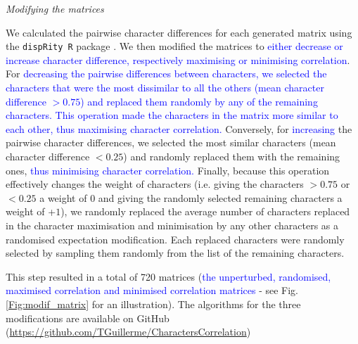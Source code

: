 \documentclass[12pt,letterpaper]{article}
\renewcommand{\subsection}[1]{%
\bigskip
\begin{center}
\begin{large}
\normalfont\itshape #1
\end{large}
\end{center}}
\begin{document}
\subsection{Modifying the matrices}
We calculated the pairwise character differences for each generated matrix using the \texttt{dispRity R} package \citep{thomas_guillerme_2016_55646}.
We then modified the matrices to \textcolor{blue}{either decrease or increase character difference, respectively maximising or minimising correlation}.
For \textcolor{blue}{decreasing the pairwise differences between characters, we selected the characters that were the most dissimilar to all the others (mean character difference $>0.75$) and replaced them randomly by any of the remaining characters.
This operation made the characters in the matrix more similar to each other, thus maximising character correlation.}
Conversely, for \textcolor{blue}{increasing} the pairwise character differences, we selected the most similar characters (mean character difference $<0.25$) and randomly replaced them with the remaining ones, \textcolor{blue}{thus minimising character correlation.}
Finally, because this operation effectively changes the weight of characters (i.e. giving the characters $>0.75$ or $<0.25$ a weight of $0$ and giving the randomly selected remaining characters a weight of +$1$), we randomly replaced the average number of characters replaced in the character maximisation and minimisation by any other characters as a randomised expectation modification.
Each replaced characters were randomly selected by sampling them randomly from the list of the remaining characters.

This step resulted in a total of 720 matrices (\textcolor{blue}{the unperturbed, randomised, maximised correlation and minimised correlation matrices} - see Fig. \ref{Fig:modif_matrix} for an illustration).
The algorithms for the three modifications are available on GitHub (\url{https://github.com/TGuillerme/CharactersCorrelation})
\end{document}
